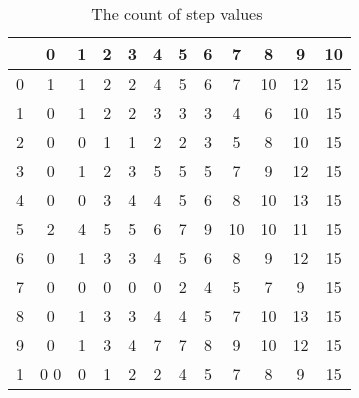 \documentclass[12pt]{article}
\begin{document}
\begin{example}
    \begin{table}
      \centering
      \begin{tabular}{c|ccccccccccc}
        &  0 & 1 & 2 & 3 & 4 & 5 & 6 & 7 & 8 & 9 & 10 \\
        \hline
        0&  1 & 1 & 2 & 2 & 4 & 5 & 6 & 7 &10 &12 & 15 \\
        1&  0 & 1 & 2 & 2 & 3 & 3 & 3 & 4 & 6 &10 & 15 \\
        2&  0 & 0 & 1 & 1 & 2 & 2 & 3 & 5 & 8 &10 & 15 \\
        3&  0 & 1 & 2 & 3 & 5 & 5 & 5 & 7 & 9 &12 & 15 \\
        4&  0 & 0 & 3 & 4 & 4 & 5 & 6 & 8 &10 &13 & 15 \\
        5&  2 & 4 & 5 & 5 & 6 & 7 & 9 &10 &10 &11 & 15 \\
        6&  0 & 1 & 3 & 3 & 4 & 5 & 6 & 8 & 9 &12 & 15 \\
        7&  0 & 0 & 0 & 0 & 0 & 2 & 4 & 5 & 7 & 9 & 15 \\
        8&  0 & 1 & 3 & 3 & 4 & 4 & 5 & 7 &10 &13 & 15 \\
        9&  0 & 1 & 3 & 4 & 7 & 7 & 8 & 9 &10 &12 & 15 \\
        1&0 0 & 0 & 1 & 2 & 2 & 4 & 5 & 7 & 8 & 9 & 15 \\
      \end{tabular}
      \caption{The count of step values \( \)}
      \label{tab:serialsignificance:rhon}
    \end{table}


\end{example}
\end{document}

